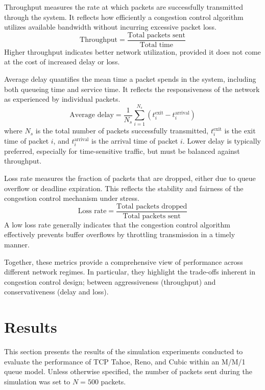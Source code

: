 \documentclass[conference]{IEEEtran}
\begin{document}
Throughput measures the rate at which packets are successfully transmitted through the system. 
It reflects how efficiently a congestion control algorithm utilizes available bandwidth without incurring excessive packet loss.
\begin{equation}
    \text{Throughput} = \frac{\text{Total packets sent}}{\text{Total time}} \label{eq:7}
\end{equation}
Higher throughput indicates better network utilization, provided it does not come at the cost of increased delay or loss.

Average delay quantifies the mean time a packet spends in the system, including both queueing time and service time. 
It reflects the responsiveness of the network as experienced by individual packets.
\begin{equation}
    \text{Average delay} = \frac{1}{N_s} \sum_{i=1}^{N_s} (t_{i}^{\text{exit}} - t_{i}^{\text{arrival}}) \label{eq:8}
\end{equation}
where $N_s$ is the total number of packets successfully transmitted, $t_{i}^{\text{exit}}$ is the exit time of packet $i$, and $t_{i}^{\text{arrival}}$ is the arrival time of packet $i$.
Lower delay is typically preferred, especially for time-sensitive traffic, but must be balanced against throughput.

Loss rate measures the fraction of packets that are dropped, either due to queue overflow or deadline expiration. 
This reflects the stability and fairness of the congestion control mechanism under stress.
\begin{equation}
    \text{Loss rate} = \frac{\text{Total packets dropped}}{\text{Total packets sent}} \label{eq:9}
\end{equation}
A low loss rate generally indicates that the congestion control algorithm effectively prevents buffer overflows by throttling transmission in a timely manner.

Together, these metrics provide a comprehensive view of performance across different network regimes. 
In particular, they highlight the trade-offs inherent in congestion control design; between aggressiveness (throughput) and conservativeness (delay and loss).

\section{Results}
This section presents the results of the simulation experiments conducted to evaluate the performance of TCP Tahoe, Reno, and Cubic within an M/M/1 queue model.
Unless otherwise specified, the number of packets sent during the simulation was set to $N=500$ packets.
\end{document}
